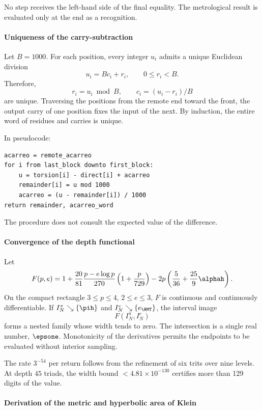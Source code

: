 No step receives the left-hand side of the final equality. The
metrological result is evaluated only at the end as a recognition.

\paragraph{Uniqueness of the carry-subtraction}

Let \(B=1000\). For each position, every integer \(u_i\) admits a unique
Euclidean division
\[
u_i=Bc_i+r_i,\qquad 0\le r_i<B.
\]
Therefore,
\[
r_i=u_i\bmod B,\qquad c_i=(u_i-r_i)/B
\]
are unique. Traversing the positions from the remote end toward the
front, the output carry of one position fixes the input of the next.
By induction, the entire word of residues and carries is unique.

In pseudocode:
\begin{verbatim}
acarreo = remote_acarreo
for i from last_block downto first_block:
    u = torsion[i] - direct[i] + acarreo
    remainder[i] = u mod 1000
    acarreo = (u - remainder[i]) / 1000
return remainder, acarreo_word
\end{verbatim}
The procedure does not consult the expected value of the difference.

\paragraph{Convergence of the depth functional}

Let
\[
F(p,e)=1+\frac{20}{81}
\frac{p-e\log p}{270}\left(1+\frac{p}{729}\right)
-2p\left(\frac5{36}+\frac{25}{9}\alphah\right).
\]
On the compact rectangle \(3\le p\le4\), \(2\le e\le3\), \(F\) is
continuous and continuously differentiable. If \(I_N^\pi\searrow\{\pih\}\) and
\(I_N^e\searrow\{e_{\HMT}\}\), the interval image
\[
F(I_N^\pi,I_N^e)
\]
forms a nested family whose width tends to zero. The intersection is a
single real number, \(\epsone\). Monotonicity of the derivatives permits the
endpoints to be evaluated without interior sampling.

The rate \(3^{-54}\) per return follows from the refinement of six trits over
nine levels. At depth \(45\) triads, the width bound
\(<4.81\times10^{-130}\) certifies more than 129 digits of the value.

\paragraph{Derivation of the metric and hyperbolic area of Klein}

